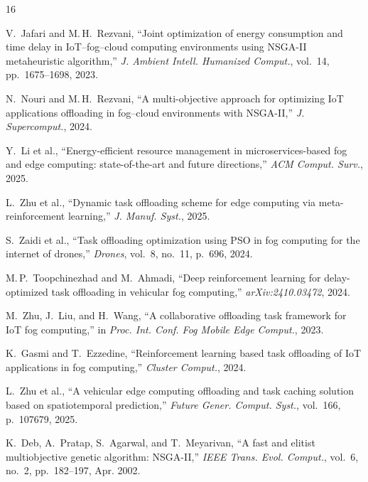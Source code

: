 \documentclass[12pt,a4paper]{article}
\theoremstyle{definition}
\theoremstyle{remark}
\begin{document}
\begin{thebibliography}{16}

V.~Jafari and M.\,H.~Rezvani,
``Joint optimization of energy consumption and time delay in {IoT}--fog--cloud
  computing environments using {NSGA-II} metaheuristic algorithm,''
\textit{J. Ambient Intell. Humanized Comput.}, vol.~14, pp.~1675--1698, 2023.

N.~Nouri and M.\,H.~Rezvani,
``A multi-objective approach for optimizing {IoT} applications offloading
  in fog--cloud environments with {NSGA-II},''
\textit{J. Supercomput.}, 2024.

Y.~Li et al.,
``Energy-efficient resource management in microservices-based fog and edge
  computing: state-of-the-art and future directions,''
\textit{ACM Comput. Surv.}, 2025.

L.~Zhu et al.,
``Dynamic task offloading scheme for edge computing via
  meta-reinforcement learning,''
\textit{J. Manuf. Syst.}, 2025.

S.~Zaidi et al.,
``Task offloading optimization using {PSO} in fog computing for the
  internet of drones,''
\textit{Drones}, vol.~8, no.~11, p.~696, 2024.

M.\,P.~Toopchinezhad and M.~Ahmadi,
``Deep reinforcement learning for delay-optimized task offloading in
  vehicular fog computing,''
\textit{arXiv:2410.03472}, 2024.

M.~Zhu, J.~Liu, and H.~Wang,
``A collaborative offloading task framework for {IoT} fog computing,''
in \textit{Proc. Int. Conf. Fog Mobile Edge Comput.}, 2023.

K.~Gasmi and T.~Ezzedine,
``Reinforcement learning based task offloading of {IoT} applications
  in fog computing,''
\textit{Cluster Comput.}, 2024.

L.~Zhu et al.,
``A vehicular edge computing offloading and task caching solution
  based on spatiotemporal prediction,''
\textit{Future Gener. Comput. Syst.}, vol.~166, p.~107679, 2025.

K.~Deb, A.~Pratap, S.~Agarwal, and T.~Meyarivan,
``A fast and elitist multiobjective genetic algorithm: {NSGA-II},''
\textit{IEEE Trans. Evol. Comput.}, vol.~6, no.~2, pp.~182--197, Apr. 2002.


\end{thebibliography}
\end{document}
